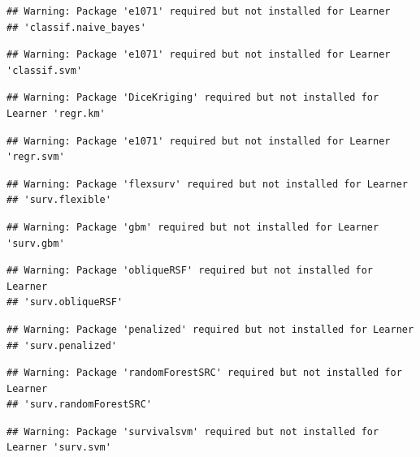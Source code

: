 \documentclass[]{scrbook}
\begin{document}
\begin{verbatim}
## Warning: Package 'e1071' required but not installed for Learner
## 'classif.naive_bayes'
\end{verbatim}

\begin{verbatim}
## Warning: Package 'e1071' required but not installed for Learner 'classif.svm'
\end{verbatim}

\begin{verbatim}
## Warning: Package 'DiceKriging' required but not installed for Learner 'regr.km'
\end{verbatim}

\begin{verbatim}
## Warning: Package 'e1071' required but not installed for Learner 'regr.svm'
\end{verbatim}

\begin{verbatim}
## Warning: Package 'flexsurv' required but not installed for Learner
## 'surv.flexible'
\end{verbatim}

\begin{verbatim}
## Warning: Package 'gbm' required but not installed for Learner 'surv.gbm'
\end{verbatim}

\begin{verbatim}
## Warning: Package 'obliqueRSF' required but not installed for Learner
## 'surv.obliqueRSF'
\end{verbatim}

\begin{verbatim}
## Warning: Package 'penalized' required but not installed for Learner
## 'surv.penalized'
\end{verbatim}

\begin{verbatim}
## Warning: Package 'randomForestSRC' required but not installed for Learner
## 'surv.randomForestSRC'
\end{verbatim}

\begin{verbatim}
## Warning: Package 'survivalsvm' required but not installed for Learner 'surv.svm'
\end{verbatim}
\end{document}
